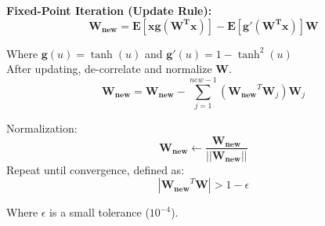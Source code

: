 \documentclass[12pt]{article}
\newcommand{\x}{\bm{x}}
\numberwithin{equation}{section}
\begin{document}
\textbf{Fixed-Point Iteration (Update Rule):}
\[
\mathbf{W_{new}} = \mathbf{E}[\x \mathbf{g}(\mathbf{W^T}\x)] - \mathbf{E}[\mathbf{g'}(\mathbf{W^T}\x)] \mathbf{W}
\]

Where
$\mathbf{g}(u) = \tanh(u)$ and $\mathbf{g'}(u) = 1 - \tanh^2(u)$
\\

After updating, de-correlate and normalize $\mathbf{W}$.
\[
\mathbf{W_{new}} = \mathbf{W_{new}} -\sum_{j=1}^{new-1}(\mathbf{W_{new}}^T\mathbf{W}_j) \mathbf{W}_j
\]

Normalization:
\[
\mathbf{W_{new}} \leftarrow \dfrac{\mathbf{W_{new}}}{|| \mathbf{W_{new}} ||}
\]
Repeat until convergence, defined as:
\[
| \mathbf{W_{new}}^T \mathbf{W}| > 1 - \epsilon
\]

Where $\epsilon$ is a small tolerance ($10^{-4}$).
\end{document}
